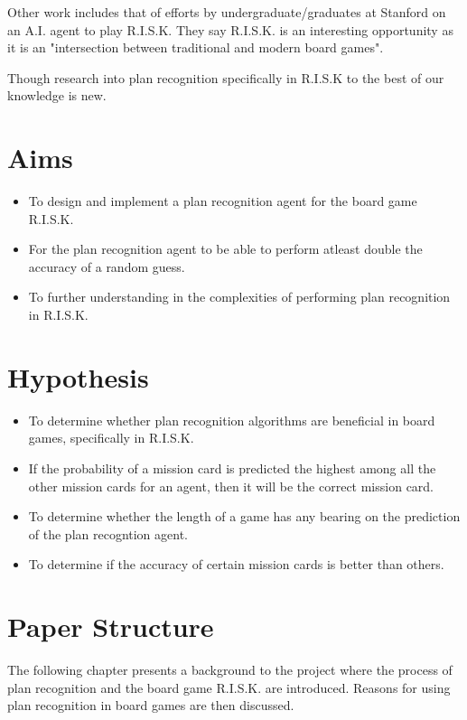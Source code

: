\documentclass[parskip]{cs4rep}
\begin{document}
Other work includes that of efforts by undergraduate/graduates at Stanford on an A.I. \cite{jlozanodbratz} agent to play R.I.S.K. They say R.I.S.K. is an interesting opportunity as it is an "intersection between traditional and modern board games".

Though research into plan recognition specifically in R.I.S.K to the best of our knowledge is new.

\section{Aims}

\begin{itemize}
\item
To design and implement a plan recognition agent for the board game R.I.S.K.
\item
For the plan recognition agent to be able to perform atleast double the accuracy of a random guess.
\item
To further understanding in the complexities of performing plan recognition in R.I.S.K.
\end{itemize}

\section{Hypothesis}

\begin{itemize}
\item
To determine whether plan recognition algorithms are beneficial in board games, specifically in R.I.S.K.
\item
If the probability of a mission card is predicted the highest among all the other mission cards for an agent, then it will be the correct mission card.
\item
To determine whether the length of a game has any bearing on the prediction of the plan recogntion agent.
\item
To determine if the accuracy of certain mission cards is better than others.
\end{itemize}

\section{Paper Structure}

The following chapter presents a background to the project where the process of plan recognition and the board game R.I.S.K. are introduced. Reasons for using plan recognition in board games are then discussed.
\end{document}
